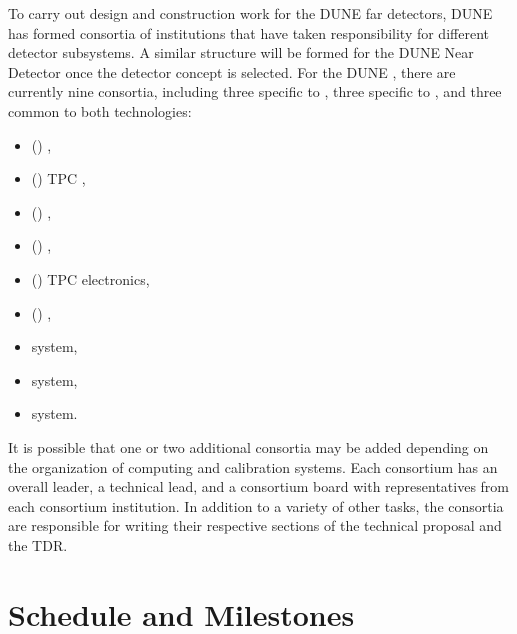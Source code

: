 To carry out design and construction work for the DUNE far detectors, DUNE has  formed consortia of institutions that have taken responsibility for different detector subsystems. A similar structure will be formed for the DUNE Near Detector once the detector concept is selected. For the DUNE , there are currently nine consortia, including three specific to \single, three specific to \dual, and three common to both technologies:
\begin{itemize}
\item (\single) , %
\item (\single) TPC , %
\item (\single) , %
\item (\dual) , %
\item (\dual) TPC electronics, %
\item (\dual) , %
\item {} system, %
\item {} system, %
\item {} system. %
\end{itemize}
It is possible that one or two additional consortia may be added depending on the organization of computing and calibration systems. Each consortium has an overall leader, a technical lead, and a consortium board with representatives from each consortium institution. In addition to a variety of other tasks, the consortia are responsible for writing their respective sections of the technical proposal and the TDR.


\section{Schedule and Milestones} 

